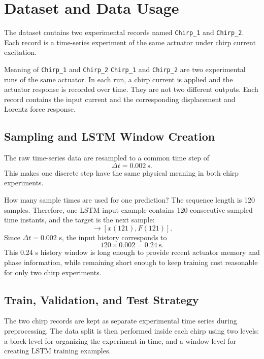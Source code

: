 \documentclass[11pt]{article}
\begin{document}
\section{Dataset and Data Usage}
The dataset contains two experimental records named \texttt{Chirp\_1} and \texttt{Chirp\_2}. Each record is a time-series experiment of the same actuator under chirp current excitation.

\begin{databox}{Meaning of \texttt{Chirp\_1} and \texttt{Chirp\_2}}
\texttt{Chirp\_1} and \texttt{Chirp\_2} are two experimental runs of the same actuator. In each run, a chirp current is applied and the actuator response is recorded over time. They are not two different outputs. Each record contains the input current and the corresponding displacement and Lorentz force response.
\end{databox}

\subsection{Sampling and LSTM Window Creation}
The raw time-series data are resampled to a common time step of
\begin{equation}
\Delta t = 0.002~\text{s}.
\end{equation}
This makes one discrete step have the same physical meaning in both chirp experiments.

\begin{databox}{How many sample times are used for one prediction?}
The sequence length is 120 samples. Therefore, one LSTM input example contains 120 consecutive sampled time instants, and the target is the next sample:
\begin{equation}
[I(1:120),x(1:120),F(1:120)]\rightarrow[x(121),F(121)].
\end{equation}
Since $\Delta t=0.002$ s, the input history corresponds to
\begin{equation}
120\times0.002 = 0.24~\text{s}.
\end{equation}
This 0.24 s history window is long enough to provide recent actuator memory and phase information, while remaining short enough to keep training cost reasonable for only two chirp experiments.
\end{databox}


\subsection{Train, Validation, and Test Strategy}
The two chirp records are kept as separate experimental time series during preprocessing. The data split is then performed inside each chirp using two levels: a block level for organizing the experiment in time, and a window level for creating LSTM training examples.
\end{document}
